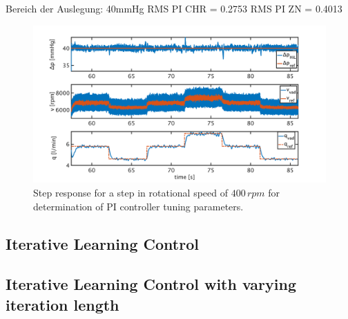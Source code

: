 Bereich der Auslegung: 40mmHg
RMS PI CHR = 0.2753
RMS PI ZN = 0.4013


\begin{figure}[ht]
  \centering
  \includegraphics[width=\textwidth]{images/chapt_5/pi_contr_zn_40.pdf}
  \caption[Step response for determination of PI controller tuning parameters]{Step response for a step in rotational speed of $400\,rpm$ for determination of PI controller tuning parameters.}
  \label{fig:pi_contr_zn_40}
\end{figure}

\subsection{Iterative Learning Control}
\subsection{Iterative Learning Control with varying iteration length}
%
%

